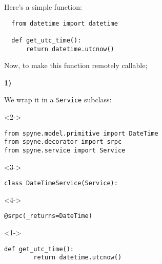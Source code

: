 \documentclass{beamer}
\begin{document}
\begin{frame}[fragile]
  \LARGE
\begin{center}

  Here's a simple function:

  \bigskip

  \bigskip

  \large

  \begin{lstlisting}
  from datetime import datetime

  def get_utc_time():
      return datetime.utcnow()
  \end{lstlisting}

\end{center}
\end{frame}

\begin{frame}
  \LARGE

  Now, to make this function remotely callable;

  \bigskip

\pause

  \color{red} \textbf{1)} \color{black}


    \begin{center}
      We wrap it in a \texttt{Service} subclass:
    \end{center}

\end{frame}

\begin{frame}[fragile]
\begin{uncoverenv}<2->
  \begin{lstlisting}[frame=none]
from spyne.model.primitive import DateTime
from spyne.decorator import srpc
from spyne.service import Service
  \end{lstlisting}
\end{uncoverenv}
\begin{uncoverenv}<3->
  \begin{lstlisting}[frame=none]
class DateTimeService(Service):
  \end{lstlisting}
  \vspace{-13pt}
\end{uncoverenv}
\begin{uncoverenv}<4->
  \begin{lstlisting}[frame=none]
    @srpc(_returns=DateTime)
  \end{lstlisting}
  \vspace{-13pt}
\end{uncoverenv}
\begin{uncoverenv}<1->
  \begin{lstlisting}[frame=none]
    def get_utc_time():
        return datetime.utcnow()
  \end{lstlisting}
\end{uncoverenv}
\end{frame}
\end{document}
